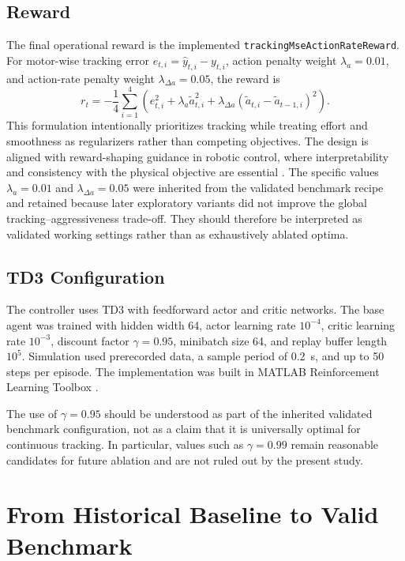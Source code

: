 \documentclass[conference]{IEEEtran}
\begin{document}
\subsection{Reward}
The final operational reward is the implemented \texttt{trackingMseActionRateReward}. For motor-wise tracking error $e_{t,i} = \hat{y}_{t,i} - y_{t,i}$, action penalty weight $\lambda_a = 0.01$, and action-rate penalty weight $\lambda_{\Delta a} = 0.05$, the reward is
\begin{equation}
r_t = -\frac{1}{4}\sum_{i=1}^{4}
\left(
e_{t,i}^{2}
+ \lambda_a \tilde{a}_{t,i}^{2}
+ \lambda_{\Delta a} (\tilde{a}_{t,i} - \tilde{a}_{t-1,i})^{2}
\right).
\label{eq:reward}
\end{equation}
This formulation intentionally prioritizes tracking while treating effort and smoothness as regularizers rather than competing objectives. The design is aligned with reward-shaping guidance in robotic control, where interpretability and consistency with the physical objective are essential \cite{deng2025reward,lee2024smoothness}. The specific values $\lambda_a = 0.01$ and $\lambda_{\Delta a} = 0.05$ were inherited from the validated benchmark recipe and retained because later exploratory variants did not improve the global tracking--aggressiveness trade-off. They should therefore be interpreted as validated working settings rather than as exhaustively ablated optima.

\subsection{TD3 Configuration}
The controller uses TD3 with feedforward actor and critic networks. The base agent was trained with hidden width 64, actor learning rate $10^{-4}$, critic learning rate $10^{-3}$, discount factor $\gamma = 0.95$, minibatch size 64, and replay buffer length $10^5$. Simulation used prerecorded data, a sample period of 0.2~s, and up to 50 steps per episode. The implementation was built in MATLAB Reinforcement Learning Toolbox \cite{mathworks_td3_agent,mathworks_td3_options,mathworks_continuous_actor}.

The use of $\gamma = 0.95$ should be understood as part of the inherited validated benchmark configuration, not as a claim that it is universally optimal for continuous tracking. In particular, values such as $\gamma = 0.99$ remain reasonable candidates for future ablation and are not ruled out by the present study.

\section{From Historical Baseline to Valid Benchmark}
\end{document}
